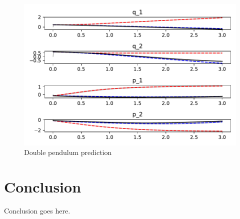 \documentclass{statsmsc}
\begin{document}
\begin{figure}[H] 
  \includegraphics[width=0.6\linewidth]{../codes/figures/double_pendulum_predicted_trajectory.pdf}
  \centering
  \caption{Double pendulum prediction}
  \label{fig:double_pendulum_prediction}
\end{figure}




\chapter{Conclusion}


Conclusion goes here. 






%
%
\end{document}
